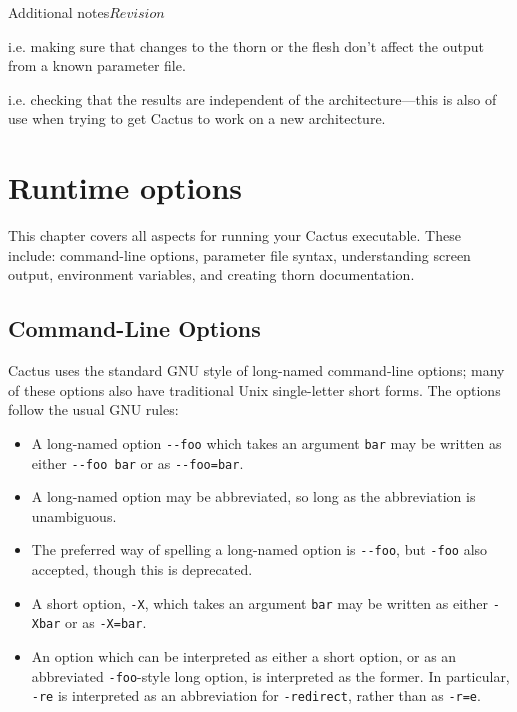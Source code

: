 \begin{cactuspart}{Additional notes}{}{$Revision$}
\begin{Lentry}
\item [Regression testing]
i.e. making sure that changes to the thorn or the flesh don't affect the
output from a known parameter file.
\item [Portability testing]
i.e. checking that the results are independent of the architecture---this
is also of use when trying to get Cactus to work on a new architecture.
\end{Lentry}


\chapter{Runtime options}

This chapter covers all aspects for running your
Cactus executable.  These include: command-line options, parameter
file syntax, understanding screen output, environment variables, and
creating thorn documentation.

\section{Command-Line Options}
\label{sec:command_line_options}

Cactus uses the standard GNU style of long-named command-line options;
many of these options also have traditional Unix single-letter short forms.
The options follow the usual GNU rules:
\begin{itemize}
\item	A long-named option \verb|--foo| which takes an argument \verb|bar|
	may be written as either \verb|--foo bar| or as \verb|--foo=bar|.
\item	A long-named option may be abbreviated, so long as the abbreviation
	is unambiguous.
\item	The preferred way of spelling a long-named option is \verb|--foo|,
	but \verb|-foo| also accepted, though this is deprecated.
\item	A short option, \verb|-X|, which takes an argument \verb|bar|
	may be written as either \verb|-Xbar| or as \verb|-X=bar|.
\item	An option which can be interpreted as either a short option,
	or as an abbreviated \verb|-foo|-style long option, is interpreted
	as the former.  In particular, \verb|-re| is interpreted as
	an abbreviation for \verb|-redirect|, rather than as \verb|-r=e|.
\end{itemize}


\end{cactuspart}
